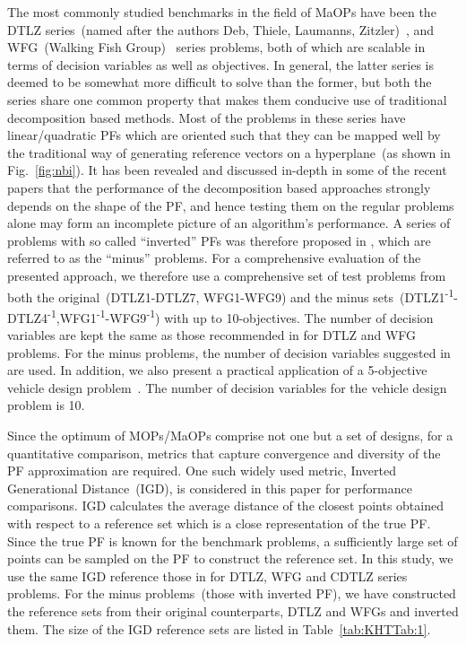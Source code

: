 The most commonly studied benchmarks in the field of MaOPs have been the DTLZ series~(named after the authors Deb, Thiele, Laumanns, Zitzler)~\cite{KHTdeb2005scalable}, and WFG~(Walking Fish Group)~\cite{KHTwfg2006huband} series problems, both of which are scalable in terms of decision variables as well as objectives. In general, the latter series is deemed to be somewhat more difficult to solve than the former, but both the series share one common property that makes them conducive use of traditional decomposition based methods. Most of the problems in these series have linear/quadratic PFs which are oriented such that they can be mapped well by the traditional way of generating reference vectors on a hyperplane~(as shown in Fig.~\ref{fig:nbi}). It has been revealed and discussed in-depth in some of the recent papers\cite{asaf2017enhanced,KHTishibuchi2016inverse} that the performance of the decomposition based approaches strongly depends on the shape of the PF, and hence testing them on the regular problems alone may form an incomplete picture of an algorithm's performance. A series of problems with so called ``inverted'' PFs was therefore proposed in  \cite{KHTishibuchi2016inverse}, which are referred to as the ``minus'' problems. For a comprehensive evaluation of the presented approach, we therefore use a comprehensive set of test problems from both the original~(DTLZ1-DTLZ7, WFG1-WFG9) and the minus sets~(DTLZ1\textsuperscript{-1}-DTLZ4\textsuperscript{-1},WFG1\textsuperscript{-1}-WFG9\textsuperscript{-1}) with up to 10-objectives. The number of decision variables are kept the same as those recommended in \cite{KHTchugh2016krvea} for DTLZ and WFG problems. For the minus problems, the number of decision variables suggested in \cite{KHTishibuchi2016inverse} are used.  In addition, we also present a practical application of a 5-objective {\color{blue}vehicle design} problem~\cite{KHTbarnum2010car}. The number of decision variables for the {\color{blue}vehicle design} problem is 10.

Since the optimum of MOPs/MaOPs comprise not one but a set of designs, for a quantitative comparison, metrics that capture convergence and diversity of the PF approximation are required. One such widely used metric, Inverted Generational Distance~(IGD), is considered in this paper for performance comparisons. IGD calculates the average distance of the closest points obtained with respect to a reference set which is a close representation of the true PF. Since the true PF is known for the benchmark problems, a sufficiently large set of points can be sampled on the PF to construct the reference set. In this study, we use the same IGD reference those in \cite{KHTchugh2016krvea,KHTchugh2016const} for DTLZ, WFG and CDTLZ series problems. For the minus problems~(those with inverted PF), we have constructed the reference sets from their original counterparts, DTLZ and WFGs and inverted them. The size of the IGD reference sets are listed in Table~\ref{tab:KHTTab:1}. 

